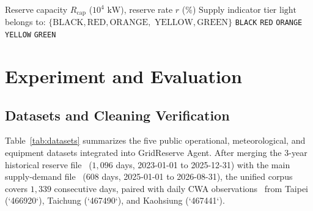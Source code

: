 \documentclass[conference]{IEEEtran}
\begin{document}
\begin{algorithm}[t]
\footnotesize
\caption{ClassifyLight: Dual-Logic Power Supply Status}
\label{alg:light}
\begin{algorithmic}[1]
\Require Reserve capacity $R_{\text{cap}}$ ($10^4\text{ kW}$),
\Statex \hspace{\algorithmicindent} reserve rate $r$ ($\%$)
\Ensure Supply indicator tier $\text{light}$ belongs to:
\Statex \hspace{\algorithmicindent} $\{\text{BLACK}, \text{RED}, \text{ORANGE},$
\Statex \hspace{\algorithmicindent} $\text{YELLOW}, \text{GREEN}\}$
    \State \Return \texttt{BLACK}
\EndIf
{}
    \State \Return \texttt{RED}
\EndIf
{}
    \State \Return \texttt{ORANGE}
\EndIf
{}
    \State \Return \texttt{YELLOW}
\EndIf
\State \Return \texttt{GREEN}
\end{algorithmic}
\end{algorithm}

\section{Experiment and Evaluation}
\label{sec:experiment}

\subsection{Datasets and Cleaning Verification}
\label{sec:datasets}

Table~\ref{tab:datasets} summarizes the five public operational, meteorological, and equipment datasets integrated into GridReserve Agent. After merging the 3-year historical reserve file~\cite{ref3} ($1{,}096$ days, 2023-01-01 to 2025-12-31) with the main supply-demand file~\cite{ref1} ($608$ days, 2025-01-01 to 2026-08-31), the unified corpus covers $1{,}339$ consecutive days, paired with daily CWA observations~\cite{ref6} from Taipei (`466920`), Taichung (`467490`), and Kaohsiung (`467441`).
\end{document}
